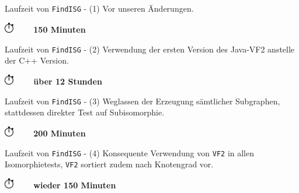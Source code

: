 \renewcommand{\mark}[1]{\node[circle,fill=#1] {};}

\begin{frame}[<+->]{Laufzeit von \texttt{FindISG} - (1)}{}
  {\beamerblue Vor unseren Änderungen.\newline}
  \begin{figure}
    \centering
    
  \end{figure}
  \begin{center}
    \includegraphics[width=0.4cm]{stop-watch-icon.png} \bf ~~~ 150 Minuten
  \end{center}
\end{frame}

\begin{frame}[<+->]{Laufzeit von \texttt{FindISG} - (2)}{}
  {\beamerblue Verwendung der ersten Version des Java-VF2 anstelle der C++ Version.\newline}
  \begin{figure}
    \centering
    
  \end{figure}
  \begin{center}
    \includegraphics[width=0.4cm]{stop-watch-icon.png} \bf ~~~ über 12 Stunden
  \end{center}
\end{frame}

\begin{frame}[<+->]{Laufzeit von \texttt{FindISG} - (3)}{}
  {\beamerblue Weglassen der Erzeugung sämtlicher Subgraphen, stattdessen direkter Test
   auf Subisomorphie.}
  \begin{figure}
    \centering
    
  \end{figure}
  \begin{center}
    \includegraphics[width=0.4cm]{stop-watch-icon.png} \bf ~~~ 200 Minuten
  \end{center}
\end{frame}

\begin{frame}[<+->]{Laufzeit von \texttt{FindISG} - (4)}{}
  {\beamerblue Konsequente Verwendung von \texttt{VF2} in allen Isomorphietests,
   \texttt{VF2} sortiert zudem nach Knotengrad vor.}
  \begin{figure}
    \centering
    
  \end{figure}
  \begin{center}
    \includegraphics[width=0.4cm]{stop-watch-icon.png} \bf ~~~ wieder 150 Minuten
  \end{center}
\end{frame}
